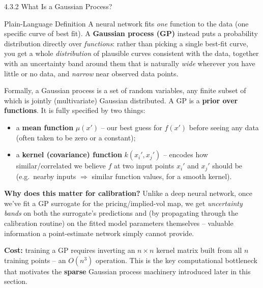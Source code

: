 \documentclass[aspectratio=169,10pt]{beamer}
\begin{document}
\begin{frame}[allowframebreaks]{4.3.2 What Is a Gaussian Process?}

\begin{block}{Plain-Language Definition}
A neural network fits \emph{one} function to the data (one specific curve
of best fit). A \textbf{Gaussian process (GP)} instead puts a probability
distribution directly over \emph{functions}: rather than picking a single
best-fit curve, you get a whole \emph{distribution} of plausible curves
consistent with the data, together with an uncertainty band around them
that is naturally \emph{wide} wherever you have little or no data, and
\emph{narrow} near observed data points.
\end{block}

Formally, a Gaussian process is a set of random variables, any finite
subset of which is jointly (multivariate) Gaussian distributed. A GP is a
\textbf{prior over functions}. It is fully specified by two things:

\begin{itemize}
  \item a \textbf{mean function} $\mu(x')$ -- our best guess for $f(x')$
        before seeing any data (often taken to be zero or a constant);
  \item a \textbf{kernel (covariance) function} $k(x_i', x_j')$ -- encodes
        how similar/correlated we believe $f$ at two input points $x_i'$
        and $x_j'$ should be (e.g.\ nearby inputs $\Rightarrow$ similar
        function values, for a smooth kernel).
\end{itemize}

\framebreak

\textbf{Why does this matter for calibration?} Unlike a deep neural
network, once we've fit a GP surrogate for the pricing/implied-vol map, we
get \emph{uncertainty bands} on both the surrogate's predictions and (by
propagating through the calibration routine) on the fitted model
parameters themselves -- valuable information a point-estimate network
simply cannot provide.

\textbf{Cost:} training a GP requires inverting an $n\times n$ kernel
matrix built from all $n$ training points -- an $O(n^3)$ operation. This
is the key computational bottleneck that motivates the
\textbf{sparse} Gaussian process machinery introduced later in this
section.

\end{frame}
\end{document}
